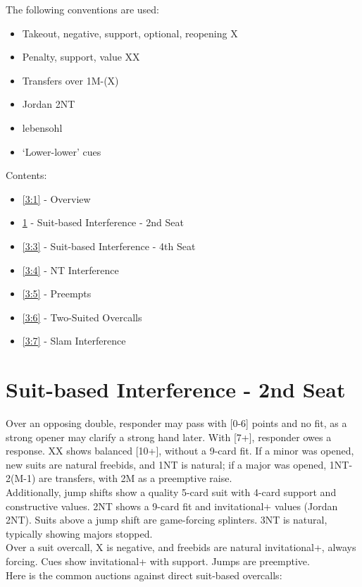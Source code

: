 \documentclass[12pt]{report}
\newcommand{\n}{\\}
\newcommand{\ul}[1]{\begin{itemize}#1\end{itemize}}
\newcommand{\li}{\item[~]}
\begin{document}
The following conventions are used:
\begin{itemize} \itemsep0em
    \item Takeout, negative, support, optional, reopening X
    \item Penalty, support, value XX
    \item Transfers over 1M-(X)
    \item Jordan 2NT
    \item lebensohl
    \item `Lower-lower' cues
\end{itemize}
Contents:
\ul {
    \li \ref{3:1} - Overview
    \li \ref{3:2} - Suit-based Interference - 2nd Seat
    \li \ref{3:3} - Suit-based Interference - 4th Seat
    \li \ref{3:4} - NT Interference
    \li \ref{3:5} - Preempts
    \li \ref{3:6} - Two-Suited Overcalls
    \li \ref{3:7} - Slam Interference
}

\newpage
\section{Suit-based Interference - 2nd Seat} \label{3:2}
    
    Over an opposing double, responder may pass with [0-6] points and no fit, as a strong opener may clarify a strong hand later.  With [7+], responder owes a response.  XX shows balanced [10+], without a 9-card fit.  If a minor was opened, new suits are natural freebids, and 1NT is natural; if a major was opened, 1NT-2(M-1) are transfers, with 2M as a preemptive raise.\n

    Additionally, jump shifts show a quality 5-card suit with 4-card support and constructive values.  2NT shows a 9-card fit and invitational+ values (Jordan 2NT).  Suits above a jump shift are game-forcing splinters.  3NT is natural, typically showing majors stopped. \n

    Over a suit overcall, X is negative, and freebids are natural invitational+, always forcing.  Cues show invitational+ with support.  Jumps are preemptive.\n

    Here is the common auctions against direct suit-based overcalls:
    
\end{document}

